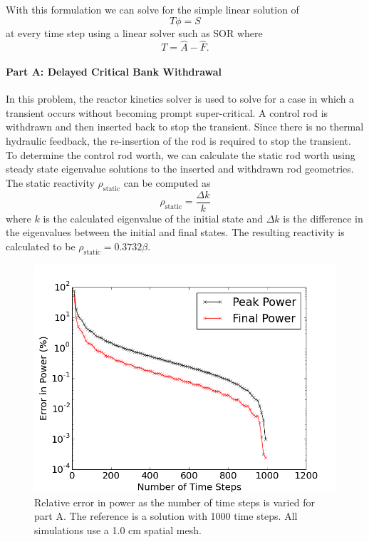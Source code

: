 \documentclass[12pt]{report}
\begin{document}
	With this formulation we can solve for the simple linear solution of
	\begin{equation}
	T \phi = S
	\end{equation}
	at every time step using a linear solver such as SOR where
	\begin{equation}
	T = \hat{A} - \hat{F}.
	\end{equation}
	
	\paragraph{Part A: Delayed Critical Bank Withdrawal}
	In this problem, the reactor kinetics solver is used to solve for a case in which a transient occurs without becoming prompt super-critical.  A control rod is withdrawn and then inserted back to stop the transient. Since there is no thermal hydraulic feedback, the re-insertion of the rod is required to stop the transient. To determine the control rod worth, we can calculate the static rod worth using steady state eigenvalue solutions to the inserted and withdrawn rod geometries. The static reactivity $\rho_\text{static}$ can be computed as 
	\begin{equation}
	\rho_\text{static} = \frac{\Delta k}{k}
	\end{equation}
	where $k$ is the calculated eigenvalue of the initial state and $\Delta k$ is the difference in the eigenvalues between the initial and final states. The resulting reactivity is calculated to be $\boxed{\rho_\text{static} = 0.3732 \beta}$.
	
	\begin{figure}[ht]
		\centering
		\includegraphics[width=.9\linewidth]{figs/partA_convergence.png}
		\caption{Relative error in power as the number of time steps is varied for part A. The reference is a solution with 1000 time steps. All simulations use a 1.0 cm spatial mesh.}
		\label{fig::partAconv}
	\end{figure}
	
\end{document}

